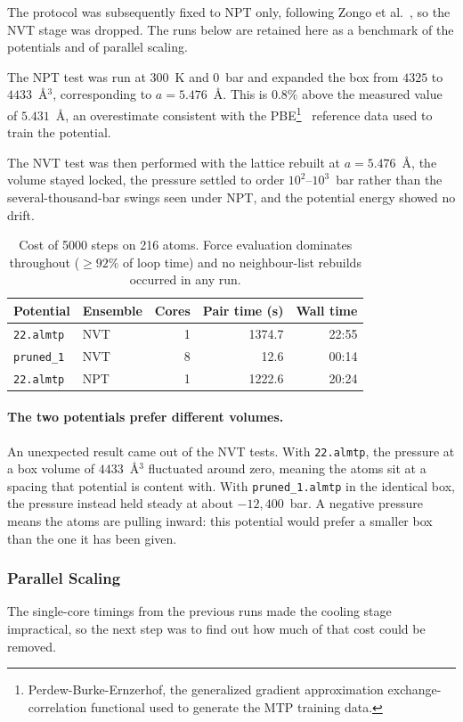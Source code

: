 \documentclass{article}
\begin{document}
The protocol was subsequently fixed to NPT only, following Zongo et al.~\cite{zongo2025}, so the NVT stage was dropped. The runs below are retained here as a benchmark of the potentials and of parallel scaling.

The NPT test was run at 300~K and 0~bar and expanded the box from $4325$ to $4433$~\AA$^3$, corresponding to $a=5.476$~\AA. This is $0.8\%$ above the measured value of $5.431$~\AA, an overestimate consistent with the PBE\footnote{Perdew-Burke-Ernzerhof, the generalized gradient approximation exchange-correlation functional used to generate the MTP training data.}~\cite{pbe1996} reference data used to train the potential.

The NVT test was then performed with the lattice rebuilt at $a=5.476$~\AA{}, the volume stayed locked, the pressure settled to order $10^2$--$10^3$~bar rather than the several-thousand-bar swings seen under NPT, and the potential energy showed no drift.

\begin{table}[H]
\centering
\small
\begin{tabular}{l|l|r|r|r}
\toprule
Potential & Ensemble & Cores & Pair time (s) & Wall time \\
\midrule
\texttt{22.almtp}  & NVT & 1 & 1374.7 & 22:55 \\
\texttt{pruned\_1} & NVT & 8 & 12.6   & 00:14 \\
\midrule
\texttt{22.almtp}  & NPT & 1 & 1222.6 & 20:24 \\
\bottomrule
\end{tabular}
\caption{Cost of 5000 steps on 216 atoms. Force evaluation dominates throughout ($\geq 92\%$ of loop time) and no neighbour-list rebuilds occurred in any run.}
\label{tab:firstruns}
\end{table}

\paragraph{The two potentials prefer different volumes.}
An unexpected result came out of the NVT tests. With \texttt{22.almtp}, the pressure at a box volume of $4433$~\AA$^3$ fluctuated around zero, meaning the atoms sit at a spacing that potential is content with. With \texttt{pruned\_1.almtp} in the identical box, the pressure instead held steady at about $-12{,}400$~bar. A negative pressure means the atoms are pulling inward: this potential would prefer a smaller box than the one it has been given.

\subsubsection{Parallel Scaling}
The single-core timings from the previous runs made the cooling stage impractical, so the next step was to find out how much of that cost could be removed.
\end{document}
